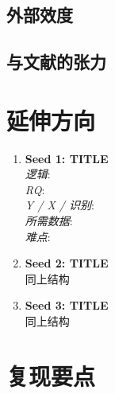 \documentclass[11pt, a4paper]{article}
\begin{document}
\subsection{外部效度}

\subsection{与文献的张力}

\section{延伸方向}

\begin{enumerate}
  \item \textbf{Seed 1: TITLE}\\
    \textit{逻辑}: \\
    \textit{RQ}: \\
    \textit{Y / X / 识别}: \\
    \textit{所需数据}: \\
    \textit{难点}:

  \item \textbf{Seed 2: TITLE}\\
    同上结构

  \item \textbf{Seed 3: TITLE}\\
    同上结构
\end{enumerate}

\section{复现要点}
\end{document}
